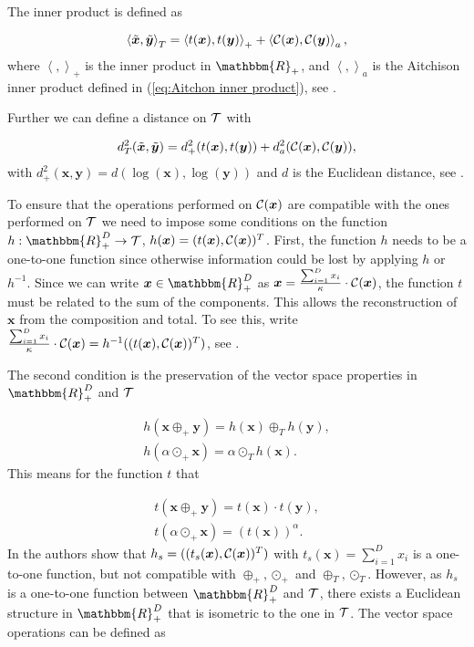 The inner product is defined as 

\begin{equation}
\left\langle \tilde{\bm{x}},\tilde{\bm{y}} \right\rangle_T = \left\langle t(\bm{x}),t(\bm{y}) \right\rangle_+ + \left\langle \mathcal{C}(\bm{x}),\mathcal{C}(\bm{y}) \right\rangle_a,
\label{eq:inner product Tspace}
\end{equation}
%
where $\left\langle ,\right\rangle_+$ is the inner product in $\mathbbm{R}_+$, and $\left\langle ,\right\rangle_a$ is the Aitchison inner product defined in (\ref{eq:Aitchon inner product}), see \textcite{Pawlowsky:2013}.

Further we can define a distance on $\mathcal{T}$ with 

\begin{gather}
d_T^2(\tilde{\bm{x}},\tilde{\bm{y}}) = d_+^2(t(\bm{x}),t(\bm{y})) + d_a^2(\mathcal{C}(\bm{x}),\mathcal{C}(\bm{y})),
\label{eq:distance Tspace}
\end{gather}
%
with $d_+^2(\bm{x},\bm{y}) = d(\log(\bm{x}),\log(\bm{y}))$ and $d$ is the Euclidean distance, see \textcite{Pawlowsky:2013}. 

To ensure that the operations performed on $\mathcal{C}(\bm{x})$ are compatible with the ones performed on $\mathcal{T}$ we need to impose some conditions on the function $h:\mathbbm{R}_+^D \rightarrow \Tsp$, $h(\bm{x})=(t(\bm{x}),\mathcal{C}(\bm{x}))^T$. First, the function $h$ needs to be a one-to-one function since otherwise information could be lost by applying $h$ or $h^{-1}$. Since we can write $\bm{x} \in \mathbbm{R}_+^D$ as $\bm{x} = \frac{\sum_{i=1}^D x_i}{\kappa} \cdot \mathcal{C}(\bm{x})$, the function $t$ must be related to the sum of the components. This allows the reconstruction of $\bm{x}$ from the composition and total. To see this, write $ \frac{\sum_{i=1}^D x_i}{\kappa} \cdot \mathcal{C}(\bm{x}) = h^{-1}((t(\bm{x}),\mathcal{C}(\bm{x}))^T)$, see \textcite{Pawlowsky:2013}. 

The second condition is the preservation of the vector space properties in $\mathbbm{R}_+^D$ and $\mathcal{T}$

\begin{gather}
h(\bm{x} \oplus_+ \bm{y}) = h(\bm{x}) \oplus_T h(\bm{y}), \\
h(\alpha \odot_+ \bm{x}) = \alpha \odot_T h(\bm{x}). 
\label{eq:Vector Space Properties}
\end{gather}
%
This means for the function $t$ that 

\begin{gather}
t(\bm{x} \oplus_+ \bm{y}) = t(\bm{x}) \cdot t(\bm{y}), \\
t(\alpha \odot_+ \bm{x}) = (t(\bm{x}))^{\alpha}.
\label{eq:Vector Space Properties for t}
\end{gather}
%
In \textcite{Pawlowsky:2013} the authors show that $h_s=((t_s(\bm{x}),\mathcal{C}(\bm{x}))^T)$ with $t_s(\bm{x}) = \sum_{i=1}^D x_i$ is a one-to-one function, but not compatible with $\oplus_+,\odot_+$ and $\oplus_T,\odot_T$. However, as $h_s$ is a one-to-one function between $\mathbbm{R}_+^D$ and $\mathcal{T}$, there exists a Euclidean structure in $\mathbbm{R}_+^D$ that is isometric to the one in $\mathcal{T}$. The vector space operations can be defined as

